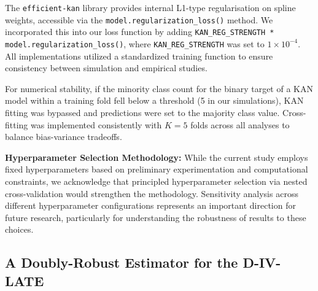 \documentclass[final,3p,fleqn, 10pt]{elsarticle}
\begin{document}
The \texttt{efficient-kan} library provides internal L1-type regularisation on spline weights, accessible via the \texttt{model.regularization\_loss()} method. We incorporated this into our loss function by adding \texttt{KAN\_REG\_STRENGTH * model.regularization\_loss()}, where \texttt{KAN\_REG\_STRENGTH} was set to $1 \times 10^{-4}$. All implementations utilized a standardized training function to ensure consistency between simulation and empirical studies.

For numerical stability, if the minority class count for the binary target of a KAN model within a training fold fell below a threshold (5 in our simulations), KAN fitting was bypassed and predictions were set to the majority class value. Cross-fitting was implemented consistently with $K=5$ folds across all analyses to balance bias-variance tradeoffs.

\textbf{Hyperparameter Selection Methodology:} While the current study employs fixed hyperparameters based on preliminary experimentation and computational constraints, we acknowledge that principled hyperparameter selection via nested cross-validation would strengthen the methodology. Sensitivity analysis across different hyperparameter configurations represents an important direction for future research, particularly for understanding the robustness of results to these choices.

\subsection{A Doubly-Robust Estimator for the D-IV-LATE}
\end{document}
